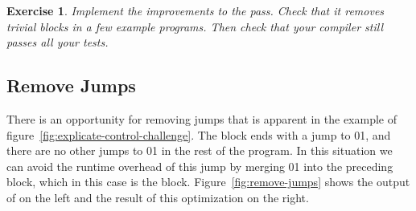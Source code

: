 \documentclass[7x10]{TimesAPriori_MIT}%
\def\racketEd{0}
\def\pythonEd{1}
\def\edition{1}
\newcommand{\racket}[1]{{\if\edition\racketEd{#1}\fi}}
\newcommand{\pythonColor}[0]{}
\newcommand{\python}[1]{{\if\edition\pythonEd\pythonColor #1\fi}}
\newtheorem{exercise}[theorem]{Exercise}
\numberwithin{theorem}{chapter}
\numberwithin{definition}{chapter}
\numberwithin{equation}{chapter}
\begin{document}



\begin{exercise}\normalfont\normalsize
  Implement the improvements to the  pass.
  Check that it removes trivial blocks in a few example programs. Then
  check that your compiler still passes all your tests.
\end{exercise}


\subsection{Remove Jumps}

There is an opportunity for removing jumps that is apparent in the
example of figure~\ref{fig:explicate-control-challenge}. The
 block ends with a jump to
\racket{}\python{}, and there are no
other jumps to \racket{}\python{} in
the rest of the program.  In this situation we can avoid the runtime
overhead of this jump by merging
\racket{}\python{} into the preceding
block, which in this case is the  block.
Figure~\ref{fig:remove-jumps} shows the output of
 on the left and the result of this
optimization on the right.
\end{document}
